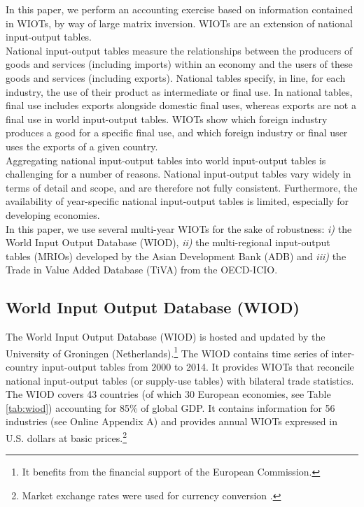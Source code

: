 \documentclass[11pt,a4paper]{paper} %
\begin{document}
In this paper, we perform an accounting exercise based on information contained in WIOTs, by way of large matrix inversion. 
WIOTs are an extension of national input-output tables. \\
National input-output tables measure the relationships between the producers of goods and services (including imports) within an economy and the users of these goods and services (including exports). 
National tables specify, in line, for each industry, the use of their product as intermediate or final use. 
In national tables, final use includes exports alongside domestic final uses, whereas exports are not a final use in world input-output tables. 
WIOTs show which foreign industry produces a good for a specific final use, and which foreign industry or final user uses the exports of a given country. \\
Aggregating national input-output tables into world input-output tables is challenging for a number of reasons. National input-output tables vary widely in terms of detail and scope, and are therefore not fully consistent. Furthermore, the availability of year-specific national input-output tables is limited, especially for developing economies. \\
In this paper, we use several multi-year WIOTs for the sake of robustness: \textit{i)} the World Input Output Database (WIOD), \textit{ii)} the multi-regional input-output tables (MRIOs) developed by the Asian Development Bank (ADB) and \textit{iii)} the Trade in Value Added Database (TiVA) from the OECD-ICIO.

\subsection{World Input Output Database (WIOD)} 
The World Input Output Database (WIOD) is hosted and updated by the University of Groningen (Netherlands).\footnote{It benefits from the financial support of the European Commission.}
The WIOD contains time series of inter-country input-output tables from 2000 to 2014. 
It provides WIOTs that reconcile national input-output tables (or supply-use tables) with bilateral trade statistics.
The WIOD covers 43 countries (of which 30 European economies, see Table \ref{tab:wiod}) accounting for 85\% of global GDP. 
It contains information for 56 industries (see Online Appendix A) and provides annual WIOTs expressed in U.S. dollars at basic prices.\footnote{Market exchange rates were used for currency conversion \citep{Timmer2015}.}
\end{document}
